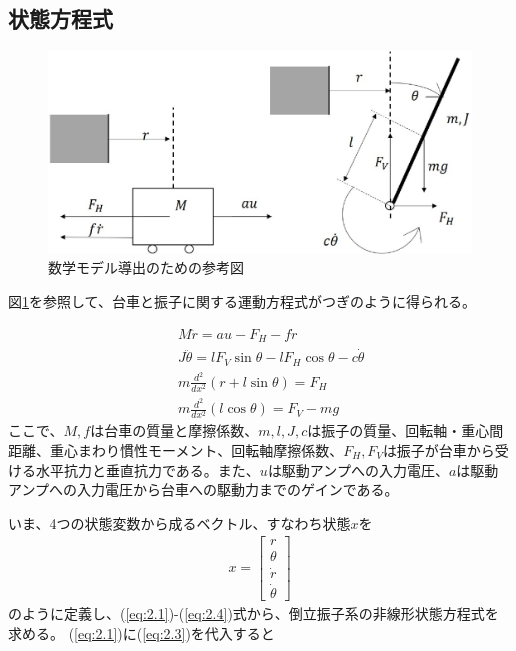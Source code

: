 \documentclass[a4j,11pt,twoside]{ujbook}
\begin{document}
		\subsection{状態方程式}
			\begin{figure}[htbp]
				\begin{center}
					\includegraphics[width = 0.6 \linewidth]{modeling.eps}
					\caption{数学モデル導出のための参考図}
					\label{fig:数式モデル導出のための参考図}
				\end{center}
			\end{figure}

			図\ref{fig:数式モデル導出のための参考図}を参照して、台車と振子に関する運動方程式がつぎのように得られる。

			\begin{eqnarray}
			&&M \ddot{r} = au - F_H - f \dot{r}
			\label{eq:2.1}\\
			&&J \ddot{\theta} = lF_V\sin{\theta} - lF_H\cos{\theta} - c\dot{\theta}
			\label{eq:2.2}\\
			&&m \frac{d^2}{dx^2} (r + l\sin{\theta})  =  F_H
			\label{eq:2.3}\\
			&&m \frac{d^2}{dx^2} (l\cos{\theta})  =  F_V - mg
			\label{eq:2.4}
			\end{eqnarray}
			ここで、$M,f$は台車の質量と摩擦係数、$m,l,J,c$は振子の質量、回転軸・重心間距離、重心まわり慣性モーメント、回転軸摩擦係数、$F_H,F_V$は振子が台車から受ける水平抗力と垂直抗力である。また、$u$は駆動アンプへの入力電圧、$a$は駆動アンプへの入力電圧から台車への駆動力までのゲインである。

			いま、4つの状態変数から成るベクトル、すなわち状態$x$を
			\begin{eqnarray*}
				x=\left[
				\begin{array}{c}
					r\\
					\theta\\
					\dot{r}\\
					\dot{\theta}
				\end{array}
				\right]
			\end{eqnarray*}
			のように定義し、(\ref{eq:2.1})-(\ref{eq:2.4})式から、倒立振子系の非線形状態方程式を求める。
			(\ref{eq:2.1})に(\ref{eq:2.3})を代入すると
\end{document}
